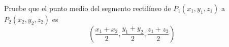 \item Pruebe que el punto medio del segmento rectilíneo de $P_1(x_1, y_1, z_1)$ a $P_2(x_2, y_2, z_2)$ es
    \[
    \left( \frac{x_1 + x_2}{2}, \frac{y_1 + y_2}{2}, \frac{z_1 + z_2}{2} \right)
    \]
